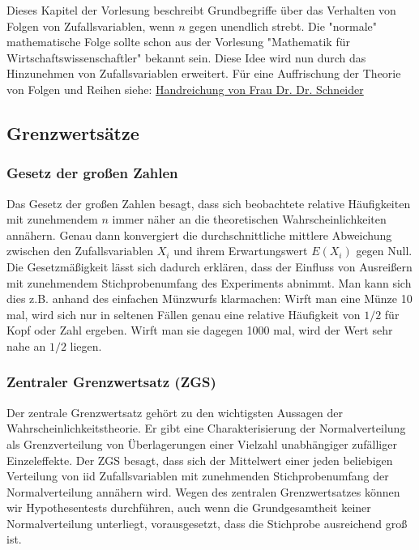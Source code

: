 \documentclass[a4paper]{article}
\begin{document}
Dieses Kapitel der Vorlesung beschreibt Grundbegriffe über das Verhalten von Folgen von Zufallsvariablen, wenn $n$ gegen unendlich strebt. Die "normale" mathematische Folge sollte schon aus der Vorlesung "Mathematik für Wirtschaftswissenschaftler" bekannt sein. Diese Idee wird nun durch das Hinzunehmen von Zufallsvariablen erweitert. Für eine Auffrischung der Theorie von Folgen und Reihen siehe: 
\href{https://www.statistik.uni-muenchen.de/formulare/skripte_u_aehnliches/mathehandrechnung_schneider.pdf}{Handreichung von Frau Dr. Dr. Schneider}

\subsection{Grenzwertsätze}\label{sec:GWS}
\subsubsection{Gesetz der großen Zahlen}\label{sec:LLN}

Das Gesetz der großen Zahlen besagt, dass sich beobachtete relative Häufigkeiten mit zunehmendem $n$ immer näher an die theoretischen Wahrscheinlichkeiten annähern. Genau dann konvergiert die durchschnittliche mittlere Abweichung zwischen den Zufallsvariablen $X_i$ und ihrem Erwartungswert $E(X_i)$ gegen Null. Die Gesetzmäßigkeit lässt sich dadurch erklären, dass der Einfluss von Ausreißern mit zunehmendem Stichprobenumfang des Experiments abnimmt. Man kann sich dies z.B. anhand des einfachen Münzwurfs klarmachen: Wirft man eine Münze 10 mal, wird sich nur in seltenen Fällen genau eine relative Häufigkeit von $1/2$ für Kopf oder Zahl ergeben. Wirft man sie dagegen 1000 mal, wird der Wert sehr nahe an $1/2$ liegen. 


\subsubsection{Zentraler Grenzwertsatz (ZGS)}\label{sec:ZGS}
Der zentrale Grenzwertsatz gehört zu den wichtigsten Aussagen der Wahrscheinlichkeitstheorie. Er gibt eine Charakterisierung der Normalverteilung als Grenzverteilung von Überlagerungen einer Vielzahl unabhängiger zufälliger Einzeleffekte. Der ZGS besagt, dass sich der Mittelwert einer jeden beliebigen Verteilung von iid Zufallsvariablen mit zunehmenden Stichprobenumfang der Normalverteilung annähern wird. Wegen des zentralen Grenzwertsatzes können wir Hypothesentests durchführen, auch wenn die Grundgesamtheit keiner Normalverteilung unterliegt, vorausgesetzt, dass die Stichprobe ausreichend groß ist.\\
\end{document}
